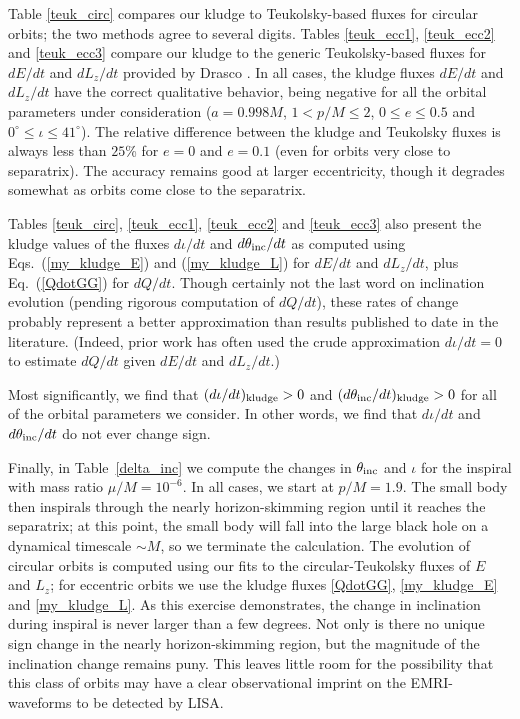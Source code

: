 \documentclass[aps,prd,twocolumn,showpacs,groupedaddress,nofootinbib]{revtex4}
\begin{document}
Table {\ref{teuk_circ}} compares our kludge to Teukolsky-based fluxes
for circular orbits; the two methods agree to several digits.  Tables
\ref{teuk_ecc1}, \ref{teuk_ecc2} and \ref{teuk_ecc3} compare our
kludge to the generic Teukolsky-based fluxes for $dE/dt$ and
$dL_z/dt$ provided by Drasco {\cite{hughes_drasco,data}}.  
In all cases, the kludge fluxes $dE/dt$ and
$dL_z/dt$ have the correct qualitative behavior, being negative for
all the orbital parameters under consideration ($a=0.998 M$, $1 < p/M
\leq 2$, $0 \leq e \leq 0.5$ and $0^\circ \leq \iota \leq 41^\circ$).
The relative difference between the kludge and Teukolsky fluxes is
always less than $25$\% for $e=0$ and $e=0.1$ (even for orbits very
close to separatrix).  The accuracy remains good at larger
eccentricity, though it degrades somewhat as orbits come close to the
separatrix.

Tables \ref{teuk_circ}, \ref{teuk_ecc1}, \ref{teuk_ecc2} and
\ref{teuk_ecc3} also present the kludge values of the fluxes
$d\iota/dt$ and $d\theta_{\rm inc}/dt$ as computed using Eqs.\
(\ref{my_kludge_E}) and (\ref{my_kludge_L}) for $dE/dt$ and $dL_z/dt$,
plus Eq.\ (\ref{QdotGG}) for $dQ/dt$.  Though certainly not the last
word on inclination evolution (pending rigorous computation of
$dQ/dt$), these rates of change probably represent a better
approximation than results published to date in the literature.
(Indeed, prior work has often used the crude approximation $d\iota/dt
=0$ \cite{hughes_drasco} to estimate $dQ/dt$ given $dE/dt$ and
$dL_z/dt$.)

Most significantly, we find that $(d\iota/dt)_{\rm kludge}>0$ and
$(d\theta_{\rm inc}/dt)_{\rm kludge}>0$ for all of the orbital
parameters we consider.  In other words, we find that $d\iota/dt$ and
$d\theta_{\rm inc}/dt$ do not ever change sign. 

Finally, in Table~\ref{delta_inc} we compute the changes in
$\theta_{\rm inc}$ and $\iota$ for the inspiral with mass ratio
$\mu/M=10^{-6}$.  In all cases, we start at $p/M=1.9$.  The small body
then inspirals through the nearly horizon-skimming region until it
reaches the separatrix; at this point, the small body will fall into
the large black hole on a dynamical timescale $\sim M$, so we
terminate the calculation.  The evolution of circular orbits is
computed using our fits to the circular-Teukolsky fluxes of $E$ and
$L_z$; for eccentric orbits we use the kludge fluxes {\eqref{QdotGG}},
{\eqref{my_kludge_E}} and {\eqref{my_kludge_L}}.  As this exercise
demonstrates, the change in inclination during inspiral is never
larger than a few degrees.  Not only is there no unique sign change in
the nearly horizon-skimming region, but the magnitude of the
inclination change remains puny.  This leaves little room for the
possibility that this class of orbits may have a clear observational
imprint on the EMRI-waveforms to be detected by LISA.
\end{document}
